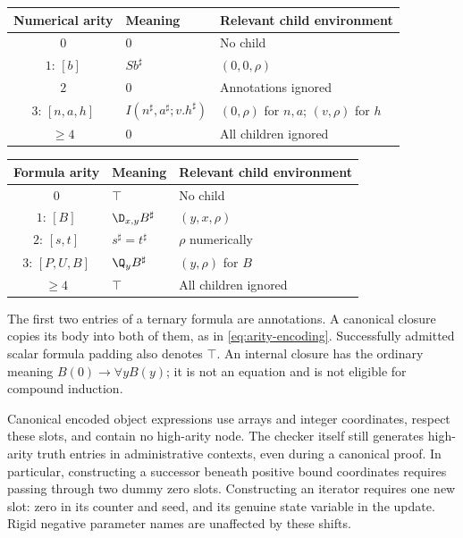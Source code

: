 \begin{center}
\begin{tabular}{cll}
\toprule
Numerical arity & Meaning & Relevant child environment\\
\midrule
$0$ & $0$ & No child\\
$1$: $[b]$ & $Sb^\sharp$ & $(0,0,\rho)$\\
$2$ & $0$ & Annotations ignored\\
$3$: $[n,a,h]$ & $I(n^\sharp,a^\sharp;v.h^\sharp)$ & $(0,\rho)$ for $n,a$; $(v,\rho)$ for $h$\\
$\geq4$ & $0$ & All children ignored\\
\bottomrule
\end{tabular}
\end{center}

\begin{center}
\begin{tabular}{cll}
\toprule
Formula arity & Meaning & Relevant child environment\\
\midrule
$0$ & $\top$ & No child\\
$1$: $[B]$ & $\D_{x,y}B^\sharp$ & $(y,x,\rho)$\\
$2$: $[s,t]$ & $s^\sharp=t^\sharp$ & $\rho$ numerically\\
$3$: $[P,U,B]$ & $\Q_yB^\sharp$ & $(y,\rho)$ for $B$\\
$\geq4$ & $\top$ & All children ignored\\
\bottomrule
\end{tabular}
\end{center}

The first two entries of a ternary formula are annotations.  A canonical
closure copies its body into both of them, as in
\eqref{eq:arity-encoding}.  Successfully admitted scalar formula padding
also denotes $\top$.  An internal closure has the ordinary meaning
$B(0)\to\forall yB(y)$; it is not an equation and is not eligible for
compound induction.

Canonical encoded object expressions use arrays and integer coordinates,
respect these slots, and contain no high-arity node.  The checker itself
still generates high-arity truth entries in administrative contexts,
even during a canonical proof.  In particular, constructing a
successor beneath positive bound coordinates requires passing through
two dummy zero slots.  Constructing an iterator requires one new slot:
zero in its counter and seed, and its genuine state variable in the
update.  Rigid negative parameter names are unaffected by these shifts.

